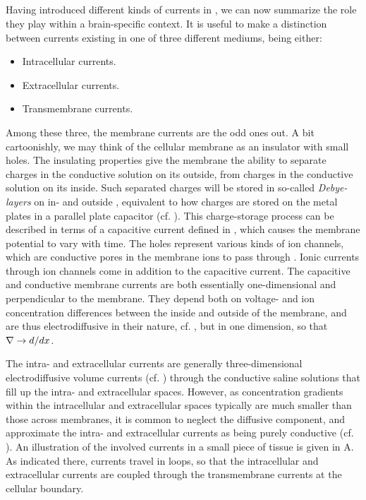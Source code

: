 \subsection{}
\label{sec:Basics:braincurrents}
Having introduced different kinds of currents in , we can now summarize the role they play within a brain-specific context. It is useful to make a distinction between currents existing in one of three different mediums, being either:
\begin{itemize}
\item Intracellular currents. 
\item Extracellular currents. 
\item Transmembrane currents. 
\end{itemize}

Among these three, the membrane currents are the odd ones out. A bit cartoonishly, we may think of the cellular membrane as an insulator with small holes. The insulating properties give the membrane the ability to separate charges in the conductive solution on its outside, from charges in the conductive solution on its inside. Such separated charges will be stored in so-called \textit{Debye-layers} on  in- and outside ,  equivalent to how charges are stored on the metal plates in a parallel plate capacitor (cf. ). This charge-storage process can be described in terms of a capacitive current defined in , which causes the membrane potential to vary with time. The holes represent various kinds of ion channels, which are conductive pores in the membrane  ions to pass through . Ionic currents through ion channels come in addition to the capacitive current. The capacitive and conductive membrane currents are both essentially one-dimensional and perpendicular to the membrane. They depend both on voltage- and ion concentration differences between the inside and outside of the membrane, and are thus electrodiffusive in their nature, cf. , but in one dimension, so that ${\bf \nabla} \rightarrow d/dx$.

The intra- and extracellular currents are generally three-dimensional electrodiffusive volume currents (cf. ) through the conductive saline solutions that fill up the intra- and extracellular spaces. However, as concentration gradients within the intracellular and extracellular spaces typically are much smaller than those across membranes, it is common to neglect the diffusive component, and approximate the intra- and extracellular currents as being purely conductive (cf. ). An illustration of the involved currents in a small piece of tissue is given in A. As indicated there, currents travel in loops, so that the intracellular and extracellular currents are coupled through the transmembrane currents at the cellular boundary. 

